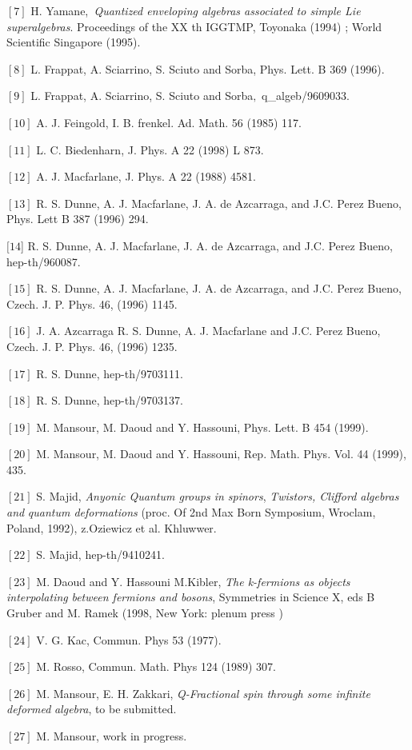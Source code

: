 \documentclass[a4paper,12pt,thmsa]{article}
\begin{document}
$[7]$ H. Yamane,\textit{\ Quantized enveloping algebras associated to simple
Lie} \textit{superalgebras}. Proceedings of the XX th IGGTMP, Toyonaka
(1994) ; World Scientific Singapore (1995).

$[8]$ L. Frappat, A. Sciarrino, S. Sciuto and Sorba, Phys. Lett. B 369
(1996).

$[9]$ L. Frappat, A. Sciarrino, S. Sciuto and Sorba$,$ q\_algeb/9609033.

$[10]$ A. J. Feingold, I. B. frenkel. Ad. Math. 56 (1985) 117.

$[11]$ L. C. Biedenharn, J. Phys. A 22 (1998) L 873.

$[12]$ A. J. Macfarlane, J. Phys. A 22 (1988) 4581.

$[13]$ R. S. Dunne, A. J. Macfarlane, J. A. de Azcarraga, and J.C. Perez
Bueno, Phys. Lett B 387 (1996) 294.

$[14$] R. S. Dunne, A. J. Macfarlane, J. A. de Azcarraga, and J.C. Perez
Bueno, hep-th/960087.

$[15]$ R. S. Dunne, A. J. Macfarlane, J. A. de Azcarraga, and J.C. Perez
Bueno, Czech. J. P. Phys. 46, (1996) 1145.

$[16]$ J. A. Azcarraga R. S. Dunne, A. J. Macfarlane and J.C. Perez Bueno,
Czech. J. P. Phys. 46, (1996) 1235.

$[17]$ R. S. Dunne, hep-th/9703111.

$[18]$ R. S. Dunne, hep-th/9703137.

$[19]$ M. Mansour, M. Daoud and Y. Hassouni, Phys. Lett. B 454 (1999).

$[20]$ M. Mansour, M. Daoud and Y. Hassouni, Rep. Math. Phys. Vol. 44
(1999), 435.

$[21]$ S. Majid, \textit{Anyonic Quantum groups in spinors}, \textit{%
Twistors, Clifford algebras and} \textit{quantum deformations} (proc. Of 2nd
Max Born Symposium, Wroclam, Poland, 1992), z.Oziewicz et al. Khluwwer.

$[22]$ S. Majid, hep-th/9410241.

$[23]$ M. Daoud and Y. Hassouni M.Kibler, \textit{The k-fermions as objects
interpolating} \textit{between fermions and bosons}, Symmetries in Science
X, eds B Gruber and M. Ramek (1998, New York: plenum press )

$[24]$ V. G. Kac, Commun. Phys 53 (1977).

$[25]$ M. Rosso, Commun. Math. Phys 124 (1989) 307.

$[26]$ M. Mansour, E. H. Zakkari, \textit{Q-Fractional spin through some
infinite deformed} \textit{algebra}, to be submitted.

$[27]$ M. Mansour, work in progress.
\end{document}
